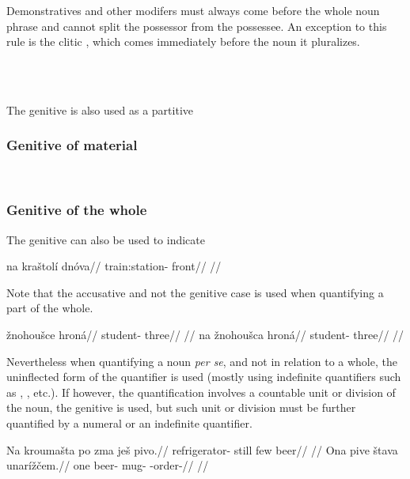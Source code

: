 Demonstratives and other modifers must always come before
the whole noun phrase and cannot split the possessor from the possessee. An
exception to this rule is the clitic , which comes immediately before
the noun it pluralizes.

\pex
\a  {}\\
\a  {}\\
\xe

The genitive is also used as a partitive 


\subsubsection{Genitive of material}

\ex
{}\\
\xe

\subsubsection{Genitive of the whole}
The genitive can also be used to indicate

\pex
\begingl
\gla na kraštolí dnóva//
\glb \Loc{} train:station-\Gen{} front//
\glft {}//
\endgl
\xe

Note that the accusative and not the genitive case is used when quantifying a part of the whole.

\pex
\a
\begingl
\gla *žnohoušce hroná//
\glb student-\Gen{} three//
\glft {}//
\endgl
\a
\begingl
\gla na žnohoušca hroná//
\glb \Loc{} student-\Gen{} three//
\glft {}//
\endgl
\xe

Nevertheless when quantifying a noun \emph{per se}, and not in relation to a
whole, the uninflected form of the quantifier is used (mostly using indefinite
quantifiers such as , , etc.). If however, the
quantification involves a countable unit or division of the noun, the genitive
is used, but such unit or division must be further quantified by a numeral or an
indefinite quantifier.

\pex
\a
\begingl
\gla Na kroumašta po zma ješ pivo.//
\glb \Loc{} refrigerator-\Acc{} still few \Exst{} beer//
\glft {}//
\endgl
\a
\begingl
\gla Ona pive štava unarížčem.//
\glb one beer-\Gen{} mug-\Acc{} \Refl{}-order-//
\glft {}//
\endgl
\xe

